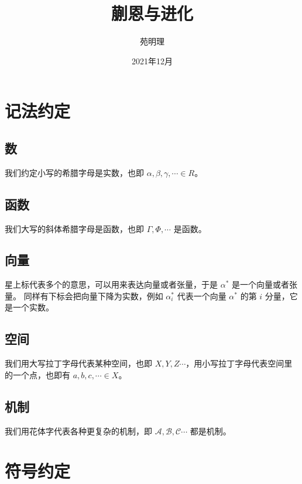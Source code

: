 \documentclass[a4paper,12pt]{article}
\title{蒯恩与进化}
\author{苑明理}
\date{2021年12月}
\begin{document}
\maketitle{}

\section{记法约定}

\subsection{数}

我们约定小写的希腊字母是实数，也即 $\alpha, \beta, \gamma, \cdots \in R$。

\subsection{函数}

我们大写的斜体希腊字母是函数，也即 $\varGamma , \varPhi , \cdots$ 是函数。

\subsection{向量}

星上标代表多个的意思，可以用来表达向量或者张量，于是 $\alpha^*$ 是一个向量或者张量。
同样有下标会把向量下降为实数，例如 $\alpha^*_i$ 代表一个向量 $\alpha^*$ 的第 $i$ 分量，它是一个实数。

\subsection{空间}

我们用大写拉丁字母代表某种空间，也即 $X, Y, Z \cdots$，用小写拉丁字母代表空间里的一个点，也即有 $a, b, c, \cdots \in X$。

\subsection{机制}

我们用花体字代表各种更复杂的机制，即 $\mathcal{A}, \mathcal{B}, \mathcal{C} \cdots$ 都是机制。

\section{符号约定}
\end{document}
